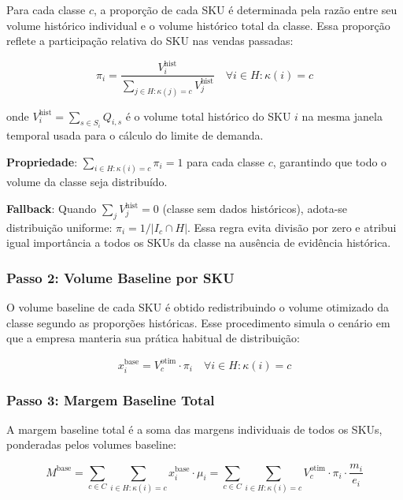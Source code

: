 \documentclass[11pt,a4paper]{article}
\begin{document}
Para cada classe $c$, a proporção de cada SKU é determinada pela razão entre
seu volume histórico individual e o volume histórico total da classe. Essa
proporção reflete a participação relativa do SKU nas vendas passadas:

\begin{equation}\label{eq:auto:030}
\pi_i = \frac{V_i^{\text{hist}}}{\displaystyle\sum_{j \in H : \kappa(j) = c} V_j^{\text{hist}}}
\quad \forall i \in H : \kappa(i) = c
\end{equation}

onde $V_i^{\text{hist}} = \sum_{s \in S_i} Q_{i,s}$ é o volume total histórico
do SKU $i$ na mesma janela temporal usada para o cálculo do limite de demanda.

\textbf{Propriedade}: $\sum_{i \in H : \kappa(i) = c} \pi_i = 1$ para cada
classe $c$, garantindo que todo o volume da classe seja distribuído.

\textbf{Fallback}: Quando $\sum_j V_j^{\text{hist}} = 0$ (classe sem dados
históricos), adota-se distribuição uniforme: $\pi_i = 1/|I_c \cap H|$. Essa
regra evita divisão por zero e atribui igual importância a todos os SKUs da
classe na ausência de evidência histórica.

\subsubsection{Passo 2: Volume Baseline por SKU}

O volume baseline de cada SKU é obtido redistribuindo o volume otimizado da
classe segundo as proporções históricas. Esse procedimento simula o cenário em
que a empresa manteria sua prática habitual de distribuição:

\begin{equation}\label{eq:auto:031}
x_i^{\text{base}} = V_c^{\text{otim}} \cdot \pi_i \quad \forall i \in H : \kappa(i) = c
\end{equation}

\subsubsection{Passo 3: Margem Baseline Total}

A margem baseline total é a soma das margens individuais de todos os SKUs,
ponderadas pelos volumes baseline:

\begin{equation}\label{eq:auto:032}
M^{\text{base}} = \sum_{c \in C} \sum_{i \in H : \kappa(i) = c} x_i^{\text{base}} \cdot \mu_i
= \sum_{c \in C} \sum_{i \in H : \kappa(i) = c} V_c^{\text{otim}} \cdot \pi_i \cdot \frac{m_i}{e_i}
\end{equation}
\end{document}
